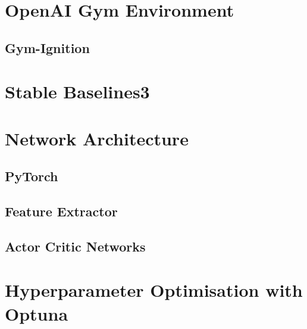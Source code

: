 \section{OpenAI Gym Environment}

\subsection{Gym-Ignition}


\section{Stable Baselines3}


\section{Network Architecture}

\subsection{PyTorch}

\subsection{Feature Extractor}

\subsection{Actor Critic Networks}


\section{Hyperparameter Optimisation with Optuna}
